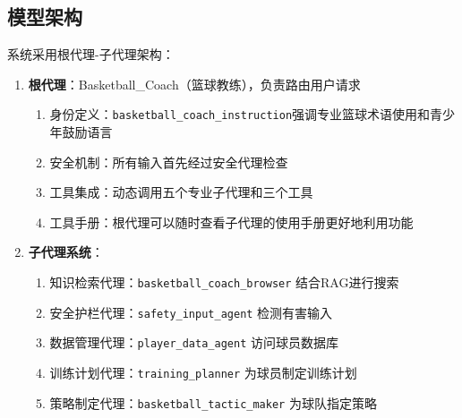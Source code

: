 \documentclass{article}
\theoremstyle{plain}
\theoremstyle{definition}
\theoremstyle{remark}
\begin{document}
\subsection{模型架构}
系统采用根代理-子代理架构：
\begin{enumerate}
    \item \textbf{根代理}：Basketball\_Coach（篮球教练），负责路由用户请求
    \begin{enumerate}
        \item 身份定义：\texttt{basketball\_coach\_instruction}强调专业篮球术语使用和青少年鼓励语言
        \item 安全机制：所有输入首先经过安全代理检查
        \item 工具集成：动态调用五个专业子代理和三个工具
        \item 工具手册：根代理可以随时查看子代理的使用手册更好地利用功能
    \end{enumerate}
    
    \item \textbf{子代理系统}：
    \begin{enumerate}
        \item 知识检索代理：\texttt{basketball\_coach\_browser} 结合RAG进行搜索
        \item 安全护栏代理：\texttt{safety\_input\_agent} 检测有害输入
        \item 数据管理代理：\texttt{player\_data\_agent} 访问球员数据库
        \item 训练计划代理：\texttt{training\_planner} 为球员制定训练计划
        \item 策略制定代理：\texttt{basketball\_tactic\_maker} 为球队指定策略
    \end{enumerate}
\end{enumerate}
\end{document}
